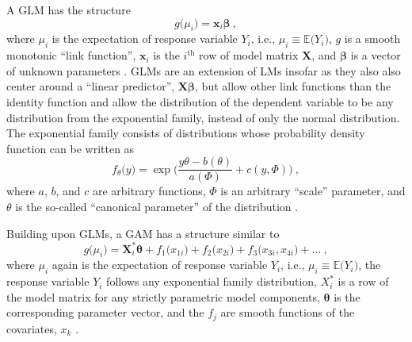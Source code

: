 A GLM has the structure
\begin{equation}
  \label{eq:GeneralizedLinearModel}
  g\bigl(\mu_i\bigr) = \symbf{x}_i \symbf{\beta}~,  %
\end{equation}
where \(\mu_i\) is the expectation of response variable \(Y_i\), i.e., \(\mu_i \equiv \mathbb{E}\bigl(Y_i\bigr)\), \(g\) is a smooth monotonic ``link function'', \(\symbf{x}_i\) is the \(i^{\text{th}}\) row of model matrix \(\symbf{X}\), and \(\symbf{\beta}\) is a vector of unknown parameters \parencite{Wood2006}.
GLMs are an extension of LMs insofar as they also also center around a ``linear predictor'', \(\symbf{X}\symbf{\beta}\), but allow other link functions than the identity function and allow the distribution of the dependent variable to be any distribution from the exponential family, instead of only the normal distribution.  The exponential family consists of distributions whose probability density function can be written as
\begin{equation}
  \label{eq:ExponentialFamilyProbabilityDensityFunction}
  f_{\theta}\bigl(y\bigr) = \exp \bigg( \frac{y \theta - b(\theta)}{a(\Phi)} + c(y, \Phi)\bigg)~,
\end{equation}
where \(a\), \(b\), and \(c\) are arbitrary functions, \(\Phi\) is an arbitrary ``scale'' parameter, and \(\theta\) is the so-called ``canonical parameter'' of the distribution \parencite{Wood2006}.

Building upon GLMs, a GAM has a structure similar to
\begin{equation}
  \label{eq:GeneralizedAdditiveModel}
  g\bigl(\mu_i\bigr) = \symbf{X}_i^* \symbf{\theta} + f_{1}\bigl(x_{1i}\bigr) + f_{2}\bigl(x_{2i}\bigr) + f_{3}\bigl(x_{3i}, x_{4i}\bigr) + \ldots~,
\end{equation}
where \(\mu_i\) again is the expectation of response variable \(Y_i\), i.e., \(\mu_i \equiv \mathbb{E}\bigl(Y_i\bigr)\), the response variable \(Y_i\) follows any exponential family distribution, \(X_i^*\) is a row of the model matrix for any strictly parametric model components, \(\symbf{\theta}\) is the corresponding parameter vector, and the \(f_j\) are smooth functions of the covariates, \(x_k\) \parencite{Wood2006}.  %

